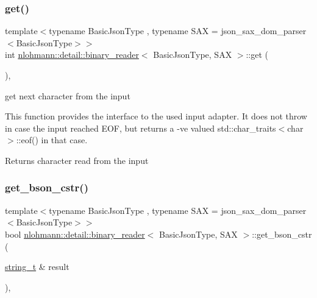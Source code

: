 \subsubsection{\texorpdfstring{get()}{get()}}
{\footnotesize\ttfamily template$<$typename Basic\+Json\+Type , typename S\+AX  = json\+\_\+sax\+\_\+dom\+\_\+parser$<$\+Basic\+Json\+Type$>$$>$ \\
int \hyperlink{classnlohmann_1_1detail_1_1binary__reader}{nlohmann\+::detail\+::binary\+\_\+reader}$<$ Basic\+Json\+Type, S\+AX $>$\+::get (\begin{DoxyParamCaption}{ }\end{DoxyParamCaption})\hspace{0.3cm}{\ttfamily [inline]}, {\ttfamily [private]}}



get next character from the input 

This function provides the interface to the used input adapter. It does not throw in case the input reached E\+OF, but returns a -\/\textquotesingle{}ve valued {\ttfamily std\+::char\+\_\+traits$<$char$>$\+::eof()} in that case.

\begin{DoxyReturn}{Returns}
character read from the input 
\end{DoxyReturn}
\mbox{\label{classnlohmann_1_1detail_1_1binary__reader_a075d20a35a09496c504c7dff135823ed}} 
\subsubsection{\texorpdfstring{get\+\_\+bson\+\_\+cstr()}{get\_bson\_cstr()}}
{\footnotesize\ttfamily template$<$typename Basic\+Json\+Type , typename S\+AX  = json\+\_\+sax\+\_\+dom\+\_\+parser$<$\+Basic\+Json\+Type$>$$>$ \\
bool \hyperlink{classnlohmann_1_1detail_1_1binary__reader}{nlohmann\+::detail\+::binary\+\_\+reader}$<$ Basic\+Json\+Type, S\+AX $>$\+::get\+\_\+bson\+\_\+cstr (\begin{DoxyParamCaption}\item[{\hyperlink{classnlohmann_1_1detail_1_1binary__reader_aa0b9729917ca7ee6ed01e3792341316e}{string\+\_\+t} \&}]{result }\end{DoxyParamCaption})\hspace{0.3cm}{\ttfamily [inline]}, {\ttfamily [private]}}



